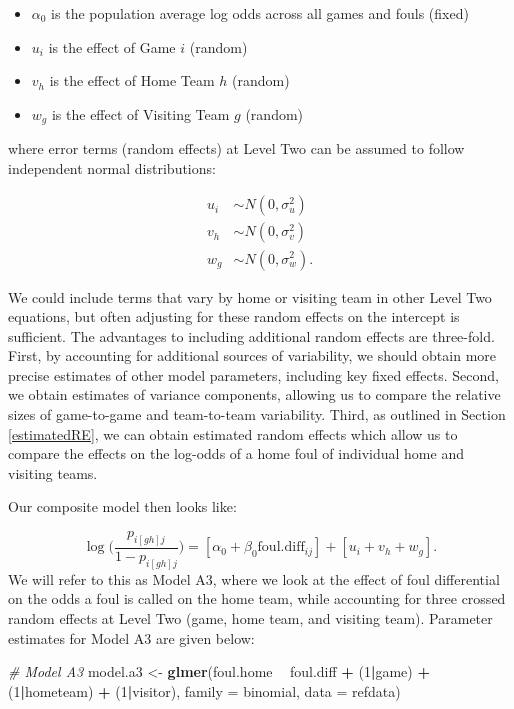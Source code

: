 \documentclass[
]{krantz}
\newenvironment{Shaded}{\begin{snugshade}}{\end{snugshade}}
\newcommand{\CommentTok}[1]{\textcolor[rgb]{0.37,0.37,0.37}{\textit{#1}}}
\newcommand{\DataTypeTok}[1]{\textcolor[rgb]{0.27,0.27,0.27}{#1}}
\newcommand{\DecValTok}[1]{\textcolor[rgb]{0.06,0.06,0.06}{#1}}
\newcommand{\KeywordTok}[1]{\textcolor[rgb]{0.27,0.27,0.27}{\textbf{#1}}}
\newcommand{\NormalTok}[1]{#1}
\newcommand{\OperatorTok}[1]{\textcolor[rgb]{0.43,0.43,0.43}{\textbf{#1}}}
\newcommand{\StringTok}[1]{\textcolor[rgb]{0.5,0.5,0.5}{#1}}
\providecommand{\tightlist}{%
  \setlength{\itemsep}{0pt}\setlength{\parskip}{0pt}}
\begin{document}
\begin{itemize}
\tightlist
\item
  \(\alpha_{0}\) is the population average log odds across all games and fouls (fixed)
\item
  \(u_{i}\) is the effect of Game \(i\) (random)
\item
  \(v_{h}\) is the effect of Home Team \(h\) (random)
\item
  \(w_{g}\) is the effect of Visiting Team \(g\) (random)
\end{itemize}

where error terms (random effects) at Level Two can be assumed to follow independent normal distributions:

\begin{align*}
u_{i} & \sim N \left( 0 , \sigma_{u}^{2} \right) \\
v_{h} & \sim N \left( 0 , \sigma_{v}^{2} \right) \\
w_{g} & \sim N \left( 0 , \sigma_{w}^{2} \right).
\end{align*}

We could include terms that vary by home or visiting team in other Level Two equations, but often adjusting for these random effects on the intercept is sufficient. The advantages to including additional random effects are three-fold. First, by accounting for additional sources of variability, we should obtain more precise estimates of other model parameters, including key fixed effects. Second, we obtain estimates of variance components, allowing us to compare the relative sizes of game-to-game and team-to-team variability. Third, as outlined in Section \ref{estimatedRE}, we can obtain estimated random effects which allow us to compare the effects on the log-odds of a home foul of individual home and visiting teams.

Our composite model then looks like:

\begin{equation*}
\log\bigg(\frac{p_{i[gh]j}}{1-p_{i[gh]j}}\bigg) = [\alpha_{0}+\beta_{0}\mathrm{foul.diff}_{ij}]+[u_{i}+v_{h}+w_{g}].
\end{equation*}
We will refer to this as Model A3, where we look at the effect of foul differential on the odds a foul is called on the home team, while accounting for three crossed random effects at Level Two (game, home team, and visiting team). Parameter estimates for Model A3 are given below:

\begin{Shaded}
\begin{Highlighting}[]
\CommentTok{# Model A3}
\NormalTok{model.a3 <-}\StringTok{ }\KeywordTok{glmer}\NormalTok{(foul.home }\OperatorTok{~}\StringTok{ }\NormalTok{foul.diff }\OperatorTok{+}\StringTok{ }\NormalTok{(}\DecValTok{1}\OperatorTok{|}\NormalTok{game) }\OperatorTok{+}\StringTok{ }
\StringTok{    }\NormalTok{(}\DecValTok{1}\OperatorTok{|}\NormalTok{hometeam) }\OperatorTok{+}\StringTok{ }\NormalTok{(}\DecValTok{1}\OperatorTok{|}\NormalTok{visitor), }
    \DataTypeTok{family =}\NormalTok{ binomial, }\DataTypeTok{data =}\NormalTok{ refdata)}
\end{Highlighting}
\end{Shaded}
\end{document}
